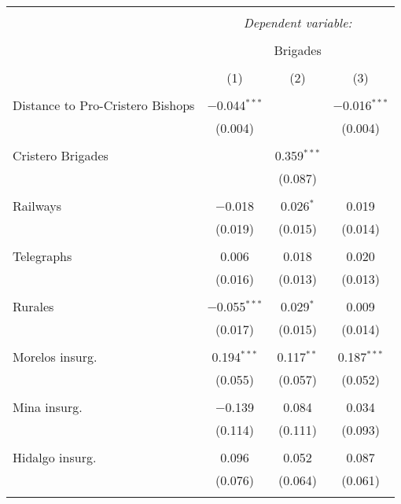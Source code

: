 
\begin{table}[!htbp] \centering 
  \caption{} 
  \label{} 
\begin{tabular}{@{\extracolsep{5pt}}lccc} 
\\[-1.8ex]\hline 
\hline \\[-1.8ex] 
 & \multicolumn{3}{c}{\textit{Dependent variable:}} \\ 
\cline{2-4} 
\\[-1.8ex] & \multicolumn{3}{c}{Brigades} \\ 
\\[-1.8ex] & (1) & (2) & (3)\\ 
\hline \\[-1.8ex] 
 Distance to Pro-Cristero Bishops & $-$0.044$^{***}$ &  & $-$0.016$^{***}$ \\ 
  & (0.004) &  & (0.004) \\ 
  & & & \\ 
 Cristero Brigades &  & 0.359$^{***}$ &  \\ 
  &  & (0.087) &  \\ 
  & & & \\ 
 Railways & $-$0.018 & 0.026$^{*}$ & 0.019 \\ 
  & (0.019) & (0.015) & (0.014) \\ 
  & & & \\ 
 Telegraphs & 0.006 & 0.018 & 0.020 \\ 
  & (0.016) & (0.013) & (0.013) \\ 
  & & & \\ 
 Rurales & $-$0.055$^{***}$ & 0.029$^{*}$ & 0.009 \\ 
  & (0.017) & (0.015) & (0.014) \\ 
  & & & \\ 
 Morelos insurg. & 0.194$^{***}$ & 0.117$^{**}$ & 0.187$^{***}$ \\ 
  & (0.055) & (0.057) & (0.052) \\ 
  & & & \\ 
 Mina insurg. & $-$0.139 & 0.084 & 0.034 \\ 
  & (0.114) & (0.111) & (0.093) \\ 
  & & & \\ 
 Hidalgo insurg. & 0.096 & 0.052 & 0.087 \\ 
  & (0.076) & (0.064) & (0.061) \\ 
  & & & \\ 

\end{tabular}
\end{table}
